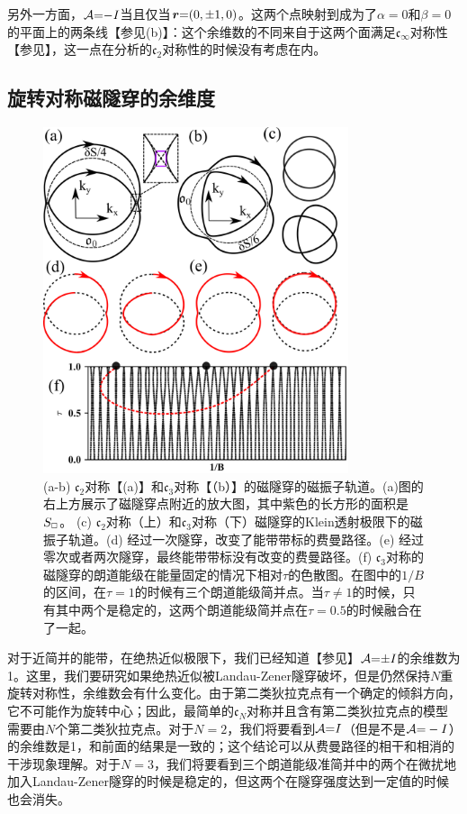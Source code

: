 另外一方面，${\cal A}{=}{-}I$当且仅当$\boldsymbol{r}{=}(0,{\pm} 1,0)$。这两个点映射到成为了$\alpha{=}0$和$\beta{=}0$的平面上的两条线【参见(b)】：这个余维数的不同来自于这两个面满足$\mathfrak{c}_{\infty}$对称性【参见】，这一点在分析的$\mathfrak{c}_2$对称性的时候没有考虑在内。

\subsection{旋转对称磁隧穿的余维度}\label{sec:rotsymmbreakdown}

\begin{figure}
\includegraphics[width=0.8\textwidth]{../figures/Cn-breakdown.png}
\centering
\caption{(a-b) $\mathfrak{c}_2$对称【(a)】和$\mathfrak{c}_3$对称【（b）】的磁隧穿的磁振子轨道。(a)图的右上方展示了磁隧穿点附近的放大图，其中紫色的长方形的面积是$S_{\scriptscriptstyle{\square}}$。 (c) $\mathfrak{c}_2$对称（上）和$\mathfrak{c}_3$对称（下）磁隧穿的Klein透射极限下的磁振子轨道。(d) 经过一次隧穿，改变了能带带标的费曼路径。(e) 经过零次或者两次隧穿，最终能带带标没有改变的费曼路径。(f) $\mathfrak{c}_3$对称的磁隧穿的朗道能级在能量固定的情况下相对$\tau$的色散图。在图中的$1/B$的区间，在$\tau=1$的时候有三个朗道能级简并点。当$\tau\ne 1$的时候，只有其中两个是稳定的，这两个朗道能级简并点在$\tau=0.5$的时候融合在了一起。\label{fig:Cn-breakdown}}
\end{figure}

对于近简并的能带，在绝热近似极限下，我们已经知道【参见】${\cal A}{=}{\pm} I$的余维数为1。这里，我们要研究如果绝热近似被Landau-Zener隧穿破坏，但是仍然保持$N$重旋转对称性，余维数会有什么变化。由于第二类狄拉克点有一个确定的倾斜方向，它不可能作为旋转中心；因此，最简单的$\mathfrak{c}_N$对称并且含有第二类狄拉克点的模型需要由$N$个第二类狄拉克点。对于$N=2$，我们将要看到${\cal A}{=}I$（但是不是${\cal A}{=}-I$）的余维数是1，和前面的结果是一致的；这个结论可以从费曼路径的相干和相消的干涉现象理解。对于$N=3$，我们将要看到三个朗道能级准简并中的两个在微扰地加入Landau-Zener隧穿的时候是稳定的，但这两个在隧穿强度达到一定值的时候也会消失。


